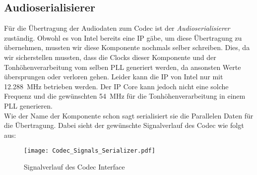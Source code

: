 \subsection{Audioserialisierer}\label{subsec:Audio_Serializer}

Für die Übertragung der Audiodaten zum Codec ist der \textit{Audioserialisierer} zuständig. Obwohl es von Intel bereits eine IP gäbe, um diese Übertragung zu übernehmen, mussten wir diese Komponente nochmals selber schreiben. Dies, da wir sicherstellen mussten, dass die Clocks dieser Komponente und der Tonhöhenverarbeitung vom selben PLL generiert werden, da ansonsten Werte übersprungen oder verloren gehen. Leider kann die IP von Intel nur mit \SI{12.288}{MHz} betrieben werden. Der IP Core kann jedoch nicht eine solche Frequenz und die gewünschten \SI{54}{MHz} für die Tonhöhenverarbeitung in einem PLL generieren.\\
Wie der Name der Komponente schon sagt serialisiert sie die Parallelen Daten für die Übertragung. Dabei sieht der gewünschte Signalverlauf des Codec wie folgt aus:

\begin{figure}[h!]
	\centering
	\texttt{[image: Codec\_Signals\_Serializer.pdf]}
	\caption{Signalverlauf des Codec Interface} 
	\label{img:Codec_Signals}
\end{figure}  